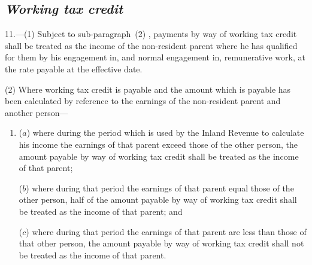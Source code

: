 \documentclass[12pt,a4paper]{article}
\begin{document}
\renewcommand\parthead{--- Schedule~Part~IV}

\subsection*{\itshape 
Working tax credit  %
}

11.---(1)  Subject to 
sub-paragraph~(2)%
, payments by way of 
working tax credit  %
shall be treated as the income of the non-resident parent where he has qualified for them by his engagement in, and normal engagement in, remunerative work, at the rate payable at the effective date.

(2) Where 
working tax credit  %
is payable and the amount which is payable has been calculated by reference to 
the earnings  %
of the non-resident parent and another person—
\begin{enumerate}\item[]
($a$) where during the period which is used by the Inland Revenue to calculate his income 
the earnings  %
of that parent exceed those of the other person, the amount payable by way of 
working tax credit  %
shall be treated as the income of that parent;

($b$) where during that period 
the earnings  %
of that parent equal those of the other person, half of the amount payable by way of 
working tax credit  %
shall be treated as the income of that parent; and

($c$) where during that period 
the earnings  %
of that parent are less than those of that other person, the amount payable by way of 
working tax credit  %
shall not be treated as the income of that parent.
\end{enumerate}
\end{document}
